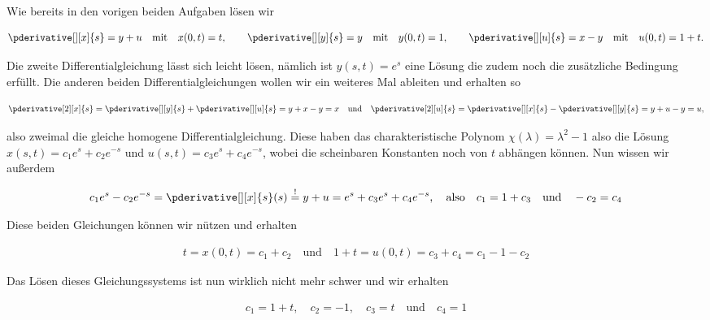 
\begin{solution}

Wie bereits in den vorigen beiden Aufgaben lösen wir

\begin{align*}
    \pderivative[][x]{s} = y + u \quad \text{mit} \quad x(0,t) = t, \qquad
    \pderivative[][y]{s} = y \quad \text{mit} \quad y(0,t) = 1, \qquad
    \pderivative[][u]{s} = x - y \quad \text{mit} \quad u(0,t) = 1 + t .
\end{align*}

Die zweite Differentialgleichung lässt sich leicht lösen, nämlich ist $y(s,t) = e^s$ eine Lösung die zudem noch die zusätzliche Bedingung erfüllt. Die anderen beiden Differentialgleichungen wollen wir ein weiteres Mal ableiten und erhalten so

\begin{align*}
    \pderivative[2][x]{s} = \pderivative[][y]{s} + \pderivative[][u]{s} = y  + x - y = x \quad \text{und} \quad \pderivative[2][u]{s} = \pderivative[][x]{s} - \pderivative[][y]{s} = y + u - y = u,
\end{align*}

also zweimal die gleiche homogene Differentialgleichung. Diese haben das charakteristische Polynom $\chi(\lambda) = \lambda^2 -1$ also die Lösung $x(s,t) = c_1 e^s + c_2 e^{-s}$ und $u(s,t) = c_3 e^s + c_4 e^{-s}$, wobei die scheinbaren Konstanten noch von $t$ abhängen können. Nun wissen wir außerdem 

\begin{align*}
    c_1 e^s - c_2 e^{-s} = \pderivative[][x]{s}(s)\stackrel{!}{=} y + u = e^s + c_3 e^s + c_4 e^{-s}, \quad \text{also} \quad c_1 = 1 + c_3 \quad \text{und} \quad -c_2 = c_4 
\end{align*}

Diese beiden Gleichungen können wir nützen und erhalten 

\begin{align*}
    t = x(0,t) = c_1 + c_2 \quad \text{und} \quad 1 + t = u(0,t) = c_3 + c_4 = c_1 - 1 - c_2
\end{align*}

Das Lösen dieses Gleichungssystems ist nun wirklich nicht mehr schwer und wir erhalten

\begin{align*}
    c_1 = 1 + t, \quad c_2 = -1, \quad c_3 = t \quad \text{und} \quad c_4 = 1
\end{align*}


\end{solution}
